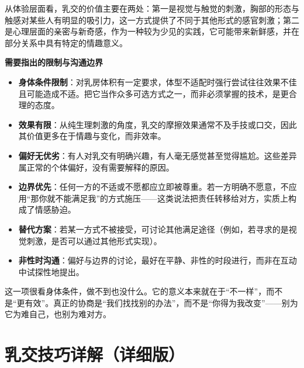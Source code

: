 \documentclass[12pt,UTF8]{ctexbook}
\begin{document}
从体验层面看，乳交的价值主要在两处：第一是视觉与触觉的刺激，胸部的形态与触感对某些人有明显的吸引力，这一方式提供了不同于其他形式的感官刺激；第二是心理层面的亲密与新奇感，作为一种较为少见的实践，它可能带来新鲜感，并在部分关系中具有特定的情趣意义。

\textbf{需要指出的限制与沟通边界}

\begin{itemize}
\item \textbf{身体条件限制}：对乳房体积有一定要求，体型不适配时强行尝试往往效果不佳且可能造成不适。把它当作众多可选方式之一，而非必须掌握的技术，是更合理的态度。
\item \textbf{效果有限}：从纯生理刺激的角度，乳交的摩擦效果通常不及手技或口交，因此其价值更多在于情趣与变化，而非效率。
\item \textbf{偏好无优劣}：有人对乳交有明确兴趣，有人毫无感觉甚至觉得尴尬。这些差异属正常的个体偏好，没有需要解释的原因。
\item \textbf{边界优先}：任何一方的不适或不愿都应立即被尊重。若一方明确不愿意，不应用“那你就不能满足我”的方式施压——这类说法把责任转移给对方，实质上构成了情感胁迫。
\item \textbf{替代方案}：若某一方式不被接受，可讨论其他满足途径（例如，若寻求的是视觉刺激，是否可以通过其他形式实现）。
\item \textbf{非性时沟通}：偏好与边界的讨论，最好在平静、非性的时段进行，而非在互动中试探性地提出。
\end{itemize}

\begin{tcolorbox}[colback=pink!5!white,colframe=red!50!black,title=贴心小叮咛]
这一项很看身体条件，做不到也没什么。它的意义本来就在于“不一样”，而不是“更有效”。真正的协商是“我们找找别的办法”，而不是“你得为我改变”——别为它为难自己，也别为难对方。
\end{tcolorbox}

\section{乳交技巧详解（详细版）}
\end{document}
